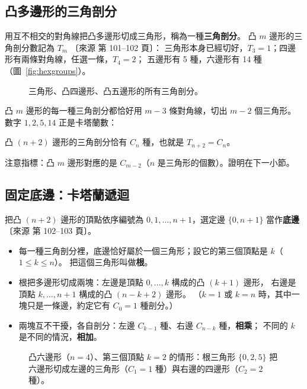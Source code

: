 \documentclass[11pt,a4paper]{article}
\newcommand{\src}[1]{{\small\color{gray!70!black}〔來源 #1〕}}  %
\begin{document}
\subsection{凸多邊形的三角剖分}

用互不相交的對角線把凸多邊形切成三角形，稱為一種\textbf{三角剖分}。
凸 $m$ 邊形的三角剖分數記為 $T_m$ \src{第 101--102 頁}：
三角形本身已經切好，$T_3=1$；四邊形有兩條對角線，任選一條，$T_4=2$；
五邊形有 5 種，六邊形有 14 種（圖~\ref{fig:hexgroups}）。

\begin{figure}[H]
\centering
\FigTriSmall
\caption{三角形、凸四邊形、凸五邊形的所有三角剖分。}
\label{fig:trismall}
\end{figure}

凸 $m$ 邊形的每一種三角剖分都恰好用 $m-3$ 條對角線，切出 $m-2$ 個三角形。
數字 $1,2,5,14$ 正是卡塔蘭數：

\begin{thmbox}[三角剖分]
凸 $(n+2)$ 邊形的三角剖分恰有 $C_n$ 種，也就是 $T_{n+2}=C_n$。
\end{thmbox}

注意指標：凸 $m$ 邊形對應的是 $C_{m-2}$（$n$ 是三角形的個數）。證明在下一小節。

\subsection{固定底邊：卡塔蘭遞迴}

把凸 $(n+2)$ 邊形的頂點依序編號為 $0,1,\ldots,n+1$，選定邊 $\{0,n+1\}$ 當作\textbf{底邊}
\src{第 102--103 頁}。
\begin{itemize}
  \item 每一種三角剖分裡，底邊恰好屬於一個三角形；設它的第三個頂點是 $k$（$1\le k\le n$）。
        把這個三角形叫做\textbf{根}。
  \item 根把多邊形切成兩塊：左邊是頂點 $0,\ldots,k$ 構成的凸 $(k+1)$ 邊形，
        右邊是頂點 $k,\ldots,n+1$ 構成的凸 $(n-k+2)$ 邊形。
        （$k=1$ 或 $k=n$ 時，其中一塊只是一條邊，約定它有 $C_0=1$ 種剖分。）
  \item 兩塊互不干擾，各自剖分：左邊 $C_{k-1}$ 種、右邊 $C_{n-k}$ 種，\textbf{相乘}；
        不同的 $k$ 是不同的情況，\textbf{相加}。
\end{itemize}

\begin{figure}[H]
\centering
\FigTriSplit
\caption{凸六邊形（$n=4$）、第三個頂點 $k=2$ 的情形：\textcolor{cTop}{根三角形} $\{0,2,5\}$
把六邊形切成\textcolor{cLeft}{左邊的三角形}（$C_1=1$ 種）與\textcolor{cRight}{右邊的四邊形}（$C_2=2$ 種）。}
\label{fig:trisplit}
\end{figure}
\end{document}
